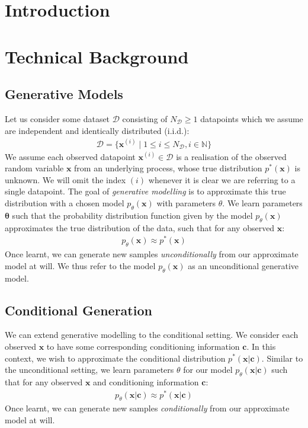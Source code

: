 \documentclass[ oneside,%
                    author={George Herbert},
                    degree={MSci},
                     title={Video Diffusion Models for Climate Simulations},
                  subtitle={}]{dissertation}
\begin{document}
\mainmatter


\chapter{Introduction}
\label{chap:introduction}

\chapter{Technical Background}
\label{chap:background}

\section{Generative Models}
\label{sec:background_generative}

Let us consider some dataset $\mathcal{D}$ consisting of $N_{\mathcal{D}}\ge1$ datapoints which we assume are independent and identically distributed (i.i.d.):
\begin{align}
      \mathcal{D}=\{\mathbf{x}^{(i)}\mid 1 \le i \le N_{\mathcal{D}}, i \in \mathbb{N} \}
\end{align}
We assume each observed datapoint $\mathbf{x}^{(i)}\in\mathcal{D}$ is a realisation of the observed random variable $\mathbf{x}$ from an underlying process, whose true distribution $p^*(\mathbf{x})$ is unknown. We will omit the index $(i)$ whenever it is clear we are referring to a single datapoint. The goal of \textit{generative modelling} is to approximate this true distribution with a chosen model $p_\theta(\mathbf{x})$ with parameters $\theta$. We learn parameters $\mathbf{\theta}$ such that the probability distribution function given by the model $p_\theta(\mathbf{x})$ approximates the true distribution of the data, such that for any observed $\mathbf{x}$:
\begin{align}
      p_\theta(\mathbf{x}) \approx p^*(\mathbf{x})
\end{align}
Once learnt, we can generate new samples \textit{unconditionally} from our approximate model at will. We thus refer to the model $p_\theta(\mathbf{x})$ as an unconditional generative model.

\section{Conditional Generation}
\label{sec:background_conditional}

We can extend generative modelling to the conditional setting. We consider each observed $\mathbf{x}$ to have some corresponding conditioning information $\mathbf{c}$. In this context, we wish to approximate the conditional distribution $p^*(\mathbf{x}|\mathbf{c})$. Similar to the unconditional setting, we learn parameters $\theta$ for our model $p_\theta(\mathbf{x}|\mathbf{c})$ such that for any observed $\mathbf{x}$ and conditioning information $\mathbf{c}$:
\begin{align}
      p_\theta(\mathbf{x}|\mathbf{c})\approx p^*(\mathbf{x}|\mathbf{c})
\end{align}
Once learnt, we can generate new samples \textit{conditionally} from our approximate model at will.
\end{document}
